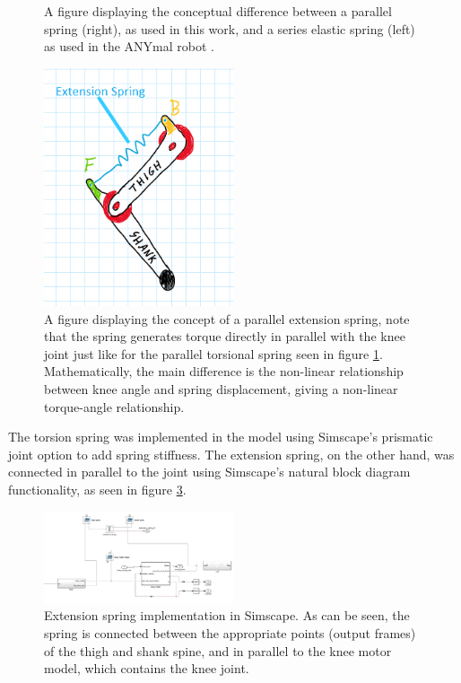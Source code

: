 \begin{figure}[htbp]
\begin{minipage}[t]{0.45\textwidth}
    \end{minipage}
    \caption{A figure displaying the conceptual difference between a parallel spring (right), as used in this work, and a series elastic spring (left) as used in the ANYmal robot \cite{hutter_anymal_2016}.}
    \label{fig:parallel_vs_series_spring}
\end{figure}


\begin{figure}
    \centering
    \includegraphics[width=0.5\textwidth]{Images/extension_spring.png}
    \caption{A figure displaying the concept of a parallel extension spring, note that the spring generates torque directly in parallel with the knee joint just like for the parallel torsional spring seen in figure \ref{fig:parallel_vs_series_spring}. Mathematically, the main difference is the non-linear relationship between knee angle and spring displacement, giving a non-linear torque-angle relationship.}
    \label{fig:extension_spring}
\end{figure}

The torsion spring was implemented in the model using Simscape's prismatic joint option to add spring stiffness. The extension spring, on the other hand, was connected in parallel to the joint using Simscape's natural block diagram functionality, as seen in figure \ref{fig:simscape_extension_spring}. 

\begin{figure}
    \centering
    \includegraphics[width=0.5\textwidth]{Images/simscape_extension_spring.png}
    \caption{Extension spring implementation in Simscape. As can be seen, the spring is connected between the appropriate points (output frames) of the thigh and shank spine, and in parallel to the knee motor model, which contains the knee joint.}
    \label{fig:simscape_extension_spring}
\end{figure}

